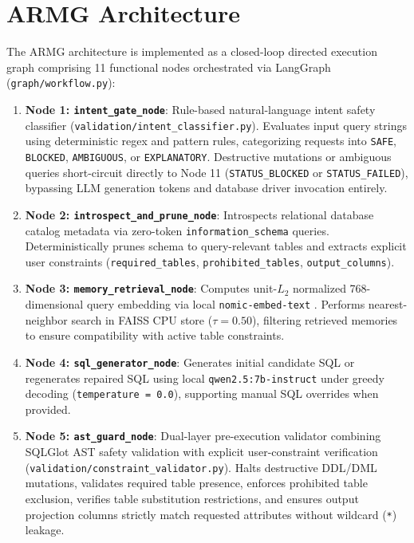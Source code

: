 \documentclass[conference]{IEEEtran}
\begin{document}
\section{ARMG Architecture}
The ARMG architecture is implemented as a closed-loop directed execution graph comprising 11 functional nodes orchestrated via LangGraph \cite{langgraph2024} (\texttt{graph/workflow.py}):
\begin{enumerate}
    \item \textbf{Node 1: \texttt{intent\_gate\_node}}: Rule-based natural-language intent safety classifier (\texttt{validation/intent\_classifier.py}). Evaluates input query strings using deterministic regex and pattern rules, categorizing requests into \texttt{SAFE}, \texttt{BLOCKED}, \texttt{AMBIGUOUS}, or \texttt{EXPLANATORY}. Destructive mutations or ambiguous queries short-circuit directly to Node 11 (\texttt{STATUS\_BLOCKED} or \texttt{STATUS\_FAILED}), bypassing LLM generation tokens and database driver invocation entirely.
    \item \textbf{Node 2: \texttt{introspect\_and\_prune\_node}}: Introspects relational database catalog metadata via zero-token \texttt{information\_schema} queries. Deterministically prunes schema to query-relevant tables and extracts explicit user constraints (\texttt{required\_tables}, \texttt{prohibited\_tables}, \texttt{output\_columns}).
    \item \textbf{Node 3: \texttt{memory\_retrieval\_node}}: Computes unit-$L_2$ normalized 768-dimensional query embedding via local \texttt{nomic-embed-text} \cite{nussbaum2024nomic}. Performs nearest-neighbor search in FAISS CPU store \cite{johnson2021faiss} ($\tau = 0.50$), filtering retrieved memories to ensure compatibility with active table constraints.
    \item \textbf{Node 4: \texttt{sql\_generator\_node}}: Generates initial candidate SQL or regenerates repaired SQL using local \texttt{qwen2.5:7b-instruct} \cite{qwen2024qwen25} under greedy decoding (\texttt{temperature = 0.0}), supporting manual SQL overrides when provided.
    \item \textbf{Node 5: \texttt{ast\_guard\_node}}: Dual-layer pre-execution validator combining SQLGlot \cite{mao2023sqlglot} AST safety validation with explicit user-constraint verification (\texttt{validation/constraint\_validator.py}). Halts destructive DDL/DML mutations, validates required table presence, enforces prohibited table exclusion, verifies table substitution restrictions, and ensures output projection columns strictly match requested attributes without wildcard (\texttt{*}) leakage.

\end{enumerate}
\end{document}
